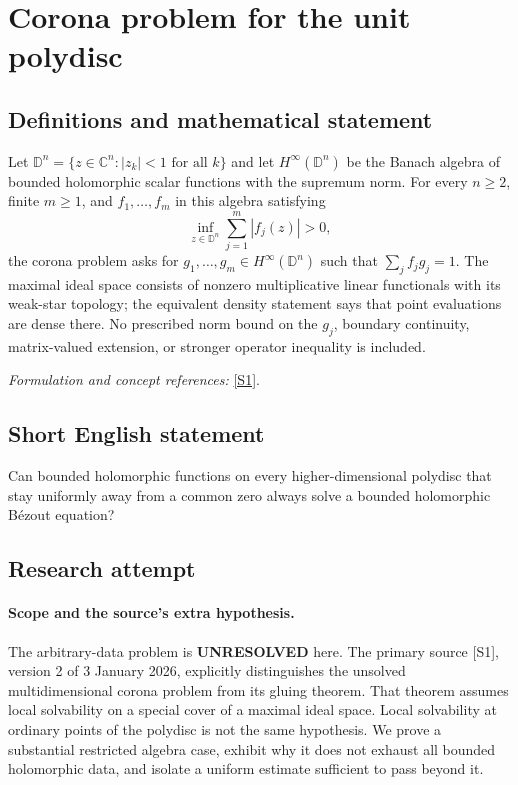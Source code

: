 \documentclass[11pt]{article}
\begin{document}
\section*{\texorpdfstring{Corona problem for the unit polydisc}{Corona problem for the unit polydisc}}\label{349}
\subsection{Definitions and mathematical statement}
Let $\mathbb D^n=\{z\in{\mathbb{C}}^n:|z_k|<1\text{ for all }k\}$ and let $H^\infty(\mathbb D^n)$ be the Banach algebra of bounded holomorphic scalar functions with the supremum norm. For every $n\ge2$, finite $m\ge1$, and $f_1,\ldots,f_m$ in this algebra satisfying
\[
 \inf_{z\in\mathbb D^n}\sum_{j=1}^m|f_j(z)|>0,
\]
the corona problem asks for $g_1,\ldots,g_m\in H^\infty(\mathbb D^n)$ such that $\sum_jf_jg_j=1$. The maximal ideal space consists of nonzero multiplicative linear functionals with its weak-star topology; the equivalent density statement says that point evaluations are dense there. No prescribed norm bound on the $g_j$, boundary continuity, matrix-valued extension, or stronger operator inequality is included.
\par\smallskip\textit{Formulation and concept references:} \href{https://arxiv.org/pdf/2512.23733v2}{[S1]}.

\subsection{Short English statement}
Can bounded holomorphic functions on every higher-dimensional polydisc that stay uniformly away from a common zero always solve a bounded holomorphic B\'ezout equation?
\subsection{Research attempt}
\paragraph{Scope and the source's extra hypothesis.}
The arbitrary-data problem is \textbf{UNRESOLVED} here. The primary
source [S1], version 2 of 3 January 2026, explicitly distinguishes
the unsolved multidimensional corona problem from its gluing theorem.
That theorem assumes local solvability on a special cover of a maximal
ideal space. Local solvability at ordinary points of the polydisc is
not the same hypothesis. We prove a substantial restricted algebra
case, exhibit why it does not exhaust all bounded holomorphic data,
and isolate a uniform estimate sufficient to pass beyond it.
\end{document}
